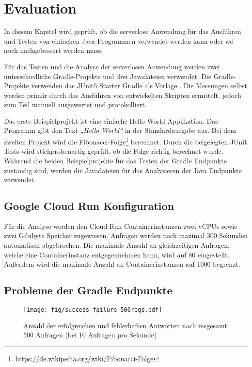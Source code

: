 \chapter{Evaluation}
In diesem Kapitel wird geprüft, ob die serverlose Anwendung
für das Ausführen und Testen von einfachen Java Programmen verwendet
werden kann oder wo noch nachgebessert werden muss.

Für das Testen und die Analyse der serverlosen Anwendung werden zwei unterschiedliche
Gradle-Projekte und drei Javadateien verwendet.
Die Gradle-Projekte verwenden das JUnit5 Starter Gradle als Vorlage \cite{JunitStarterGradle}.
Die Messungen selbst werden primär durch das Ausführen von entwickelten Skripten
ermittelt, jedoch zum Teil manuell ausgewertet und protokolliert.

Das erste Beispielprojekt ist eine einfache
Hello World Applikation. Das Programm gibt den Text \emph{„Hello World“}
in der Standardausgabe aus. Bei dem zweiten Projekt wird
die Fibonacci-Folge\footnote{\url{https://de.wikipedia.org/wiki/Fibonacci-Folge}} berechnet.
Durch die beigelegten JUnit Tests wird stichprobenartig geprüft, ob die Folge richtig berechnet wurde.
Während die beiden Beispielprojekte für das Testen der Gradle Endpunkte zuständig sind,
werden die Javadateien für das Analysieren der Java Endpunkte verwendet.

\section{Google Cloud Run Konfiguration}
Für die Analyse werden den Cloud Run Containerinstanzen zwei vCPUs sowie zwei Gibibyte Speicher
zugewiesen. Anfragen werden nach maximal 300 Sekunden automatisch abgebrochen.
Die maximale Anzahl an gleichzeitigen Anfragen, welche eine Containerinstanz
entgegennehmen kann, wird auf 80 eingestellt. Außerdem wird die maximale Anzahl an Containerinstanzen
auf 1000 begrenzt.

\section{Probleme der Gradle Endpunkte}
\begin{figure}
  \centering
  \texttt{[image: fig/success\_failure\_500reqs.pdf]}
  \caption{Anzahl der erfolgreichen und fehlerhaften Antworten nach insgesamt 500 Anfragen (bei 10 Anfragen pro Sekunde)}
  \label{fig:success_failure_fivehundred}
\end{figure}

